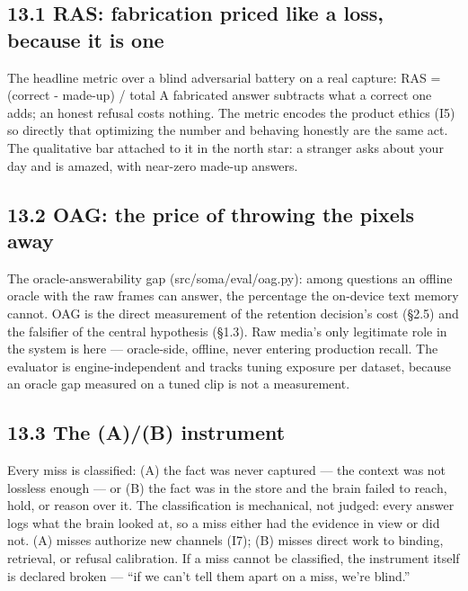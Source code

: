 \subsection{13.1 RAS: fabrication priced like a loss, because it is one}\label{ras-fabrication-priced-like-a-loss-because-it-is-one}

The headline metric over a blind adversarial battery on a real capture: RAS = (correct - made-up) / total A fabricated answer subtracts what a correct one adds; an honest refusal costs nothing. The metric encodes the product ethics (I5) so directly that optimizing the number and behaving honestly are the same act. The qualitative bar attached to it in the north star: a stranger asks about your day and is amazed, with near-zero made-up answers.

\subsection{13.2 OAG: the price of throwing the pixels away}\label{oag-the-price-of-throwing-the-pixels-away}

The oracle-answerability gap (src/soma/eval/oag.py): among questions an offline oracle with the raw frames can answer, the percentage the on-device text memory cannot. OAG is the direct measurement of the retention decision's cost (\S{}2.5) and the falsifier of the central hypothesis (\S{}1.3). Raw media's only legitimate role in the system is here --- oracle-side, offline, never entering production recall. The evaluator is engine-independent and tracks tuning exposure per dataset, because an oracle gap measured on a tuned clip is not a measurement.

\subsection{13.3 The (A)/(B) instrument}\label{the-ab-instrument}

Every miss is classified: (A) the fact was never captured --- the context was not lossless enough --- or (B) the fact was in the store and the brain failed to reach, hold, or reason over it. The classification is mechanical, not judged: every answer logs what the brain looked at, so a miss either had the evidence in view or did not. (A) misses authorize new channels (I7); (B) misses direct work to binding, retrieval, or refusal calibration. If a miss cannot be classified, the instrument itself is declared broken --- ``if we can't tell them apart on a miss, we're blind.''


